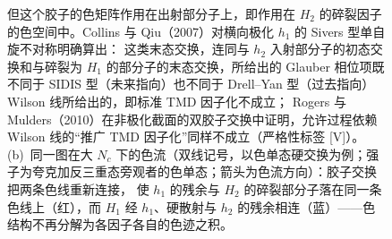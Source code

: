 \begin{figure}[htbp]
{但这个胶子的色矩阵作用在出射部分子上，即作用在 $H_2$ 的碎裂因子的色空间中。Collins 与 Qiu（2007）对横向极化 $h_1$ 的 Sivers 型单自旋不对称明确算出：
这类末态交换，连同与 $h_2$ 入射部分子的初态交换和与碎裂为 $H_1$ 的部分子的末态交换，所给出的 Glauber 相位项既不同于 SIDIS 型（未来指向）也不同于 Drell--Yan 型（过去指向）Wilson 线所给出的，即标准 TMD 因子化不成立；
Rogers 与 Mulders（2010）在非极化截面的双胶子交换中证明，允许过程依赖 Wilson 线的“推广 TMD 因子化”同样不成立（严格性标签 [V]）。
(b)~同一图在大 $N_c$ 下的色流（双线记号，以色单态硬交换为例；强子为夸克加反三重态旁观者的色单态；箭头为色流方向）：胶子交换把两条色线重新连接，
使 $h_1$ 的残余与 $H_2$ 的碎裂部分子落在同一条色线上（红），而 $H_1$ 经 $h_1$、硬散射与 $h_2$ 的残余相连（蓝）——色结构不再分解为各因子各自的色迹之积。}
\label{fig:violation-cq}
\end{figure}

